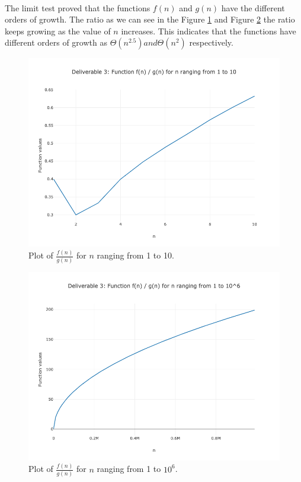 \documentclass{article}
\begin{document}
\paragraph{} The limit test proved that the functions \(f(n)\) and \(g(n)\) have the different orders of growth. The ratio as we 
can see in the Figure \ref{del31: plot_1_to_10} and Figure \ref{del31: plot_1_to10^6}
the ratio keeps growing as the value of \(n\) increases. This indicates that the functions have different orders of growth as \(\Theta(n^{2.5}) and \Theta(n^2)\) respectively.
\begin{figure}[H]
    \centering
    \includegraphics[width=\textwidth]{Deliverable 31: plot_1_to_10.png}
    \caption{Plot of \(\frac{f(n)}{g(n)}\) for $n$ ranging from 1 to 10.}
    \label{del31: plot_1_to_10}
\end{figure}

\begin{figure}[H]
    \centering
    \includegraphics[width=\textwidth]{Deliverable 31: plot_1_to_1000000.png}
    \caption{Plot of \(\frac{f(n)}{g(n)}\) for $n$ ranging from 1 to $10^6$.}
    \label{del31: plot_1_to10^6}
\end{figure}
\end{document}
